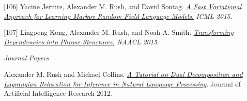 \documentclass[10pt]{article}
\begin{document}
\medskip


[106] \ind Yacine Jernite, Alexander M. Rush, and David Sontag. \emph{\href{ http://people.seas.harvard.edu/~srush/icml15.pdf }{ A Fast Variational Approach for Learning Markov Random Field Language Models.} }\emph{ ICML 2015. }

\medskip


[107] \ind Lingpeng Kong, Alexander M. Rush, and Noah A. Smith. \emph{\href{ http://people.seas.harvard.edu/~srush/naacl15.pdf }{ Transforming Dependencies into Phrase Structures.} }\emph{ NAACL 2015. }

\medskip





\vspace{0.3in}

\noindent\emph{Journal Papers \vspace{0.01in}}

\ind Alexander M. Rush and Michael Collins. \emph{\href{http://www.cs.columbia.edu/~mcollins/acltutorial.pdf}{A Tutorial on Dual Decomposition and Lagrangian Relaxation for Inference in Natural Language Processing}}. Journal of Artificial Intelligence Research 2012.







\end{document}
